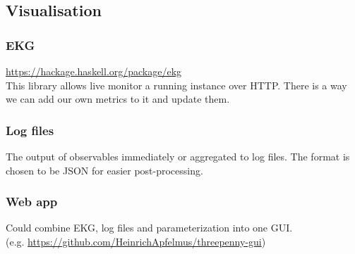 \subsection{Visualisation}

\subsubsection{EKG}
\url{https://hackage.haskell.org/package/ekg}
\\
This library allows live monitor a running instance over HTTP. There is a way
we can add our own metrics to it and update them.

\subsubsection{Log files}
The output of observables immediately or aggregated to log files. The format is chosen to be JSON for easier post-processing.

\subsubsection{Web app}
Could combine EKG, log files and parameterization into one GUI.
\\
(e.g. \url{https://github.com/HeinrichApfelmus/threepenny-gui})
